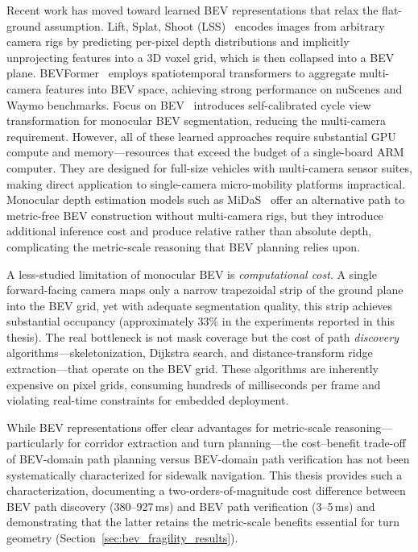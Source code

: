 \documentclass[12pt,letterpaper,oneside]{report}
\begin{document}
Recent work has moved toward learned BEV representations that relax the flat-ground assumption. Lift, Splat, Shoot (LSS)~\cite{lift_splat_shoot} encodes images from arbitrary camera rigs by predicting per-pixel depth distributions and implicitly unprojecting features into a 3D voxel grid, which is then collapsed into a BEV plane. BEVFormer~\cite{bevformer} employs spatiotemporal transformers to aggregate multi-camera features into BEV space, achieving strong performance on nuScenes and Waymo benchmarks. Focus on BEV~\cite{zhao2024bev} introduces self-calibrated cycle view transformation for monocular BEV segmentation, reducing the multi-camera requirement. However, all of these learned approaches require substantial GPU compute and memory---resources that exceed the budget of a single-board ARM computer. They are designed for full-size vehicles with multi-camera sensor suites, making direct application to single-camera micro-mobility platforms impractical. Monocular depth estimation models such as MiDaS~\cite{midas2022} offer an alternative path to metric-free BEV construction without multi-camera rigs, but they introduce additional inference cost and produce relative rather than absolute depth, complicating the metric-scale reasoning that BEV planning relies upon.

A less-studied limitation of monocular BEV is \emph{computational cost}. A single forward-facing camera maps only a narrow trapezoidal strip of the ground plane into the BEV grid, yet with adequate segmentation quality, this strip achieves substantial occupancy (approximately 33\% in the experiments reported in this thesis). The real bottleneck is not mask coverage but the cost of path \emph{discovery} algorithms---skeletonization, Dijkstra search, and distance-transform ridge extraction---that operate on the BEV grid. These algorithms are inherently expensive on pixel grids, consuming hundreds of milliseconds per frame and violating real-time constraints for embedded deployment.

While BEV representations offer clear advantages for metric-scale reasoning---particularly for corridor extraction and turn planning---the cost--benefit trade-off of BEV-domain path planning versus BEV-domain path verification has not been systematically characterized for sidewalk navigation. This thesis provides such a characterization, documenting a two-orders-of-magnitude cost difference between BEV path discovery (380--927\,ms) and BEV path verification (3--5\,ms) and demonstrating that the latter retains the metric-scale benefits essential for turn geometry (Section~\ref{sec:bev_fragility_results}).
\end{document}
